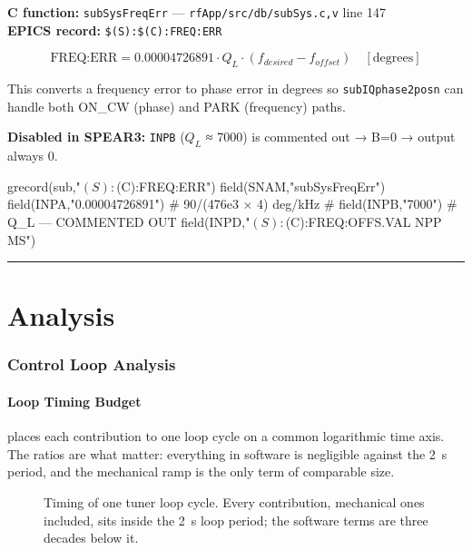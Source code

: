 \textbf{C function:} \texttt{subSysFreqErr} --- \texttt{rfApp/\allowbreak{}src/\allowbreak{}db/\allowbreak{}subSys.\allowbreak{}c,\allowbreak{}v} line 147 \\
\textbf{EPICS record:} \texttt{\$(S):\allowbreak{}\$(C):\allowbreak{}FREQ:\allowbreak{}ERR}

\begin{equation}\label{eq:freq-err}
  \text{FREQ:ERR} = 0.00004726891 \cdot Q_L \cdot (f_{desired} - f_{offset}) \quad [\text{degrees}]
\end{equation}

This converts a frequency error to phase error in degrees so \texttt{subIQphase2posn} can handle both ON\_CW (phase) and PARK (frequency) paths.

\textbf{Disabled in SPEAR3:} \texttt{INPB} (\(Q_L\) ≈ 7000) is commented out → B=0 → output always 0.

\begin{codeblock}
grecord(sub,"$(S):$(C):FREQ:ERR") {
    field(SNAM,"subSysFreqErr")
    field(INPA,"0.00004726891")   # 90/(476e3 × 4) deg/kHz
  # field(INPB,"7000")            # Q_L — COMMENTED OUT
    field(INPD,"$(S):$(C):FREQ:OFFS.VAL  NPP MS")
}
\end{codeblock}

\begin{center}\rule{0.5\linewidth}{0.5pt}\end{center}

\part{Analysis}

\section{Control Loop Analysis}\label{sec:loop-analysis}


\subsection{Loop Timing Budget}\label{sec:timing-budget}


 places each contribution to one loop cycle on a common logarithmic time axis. The ratios are what matter: everything in software is negligible against the \qty{2}{\second} period, and the mechanical ramp is the only term of comparable size.

\begin{figure}[tbp]
\centering
\begin{fitpicture}\end{fitpicture}
\caption[Tuner loop timing budget.]{Timing of one tuner loop cycle. Every contribution, mechanical ones included, sits inside the \qty{2}{\second} loop period; the software terms are three decades below it.}\label{fig:loop-timing}
\end{figure}

